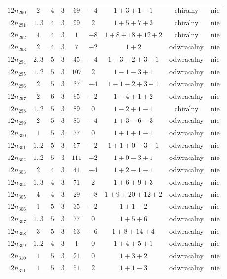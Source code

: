\begin{longtable}{ccccccccc}
$12n_{290}$ & $2$ & $4$ & $3$ & $69$ & $-4$ & $1+3+1-1$ & chiralny & nie \\
$12n_{291}$ & $1..3$ & $4$ & $3$ & $99$ & $2$ & $1+5+7+3$ & chiralny & nie \\
$12n_{292}$ & $4$ & $4$ & $3$ & $1$ & $-8$ & $1+8+18+12+2$ & chiralny & nie \\
$12n_{293}$ & $2$ & $4$ & $3$ & $7$ & $-2$ & $1+2$ & odwracalny & nie \\
$12n_{294}$ & $2..3$ & $5$ & $3$ & $45$ & $-4$ & $1-3-2+3+1$ & odwracalny & nie \\
$12n_{295}$ & $1..2$ & $5$ & $3$ & $107$ & $2$ & $1-1-3+1$ & odwracalny & nie \\
$12n_{296}$ & $2$ & $5$ & $3$ & $37$ & $-4$ & $1-1-2+3+1$ & odwracalny & nie \\
$12n_{297}$ & $2$ & $6$ & $3$ & $95$ & $-2$ & $1-4+1+2$ & odwracalny & nie \\
$12n_{298}$ & $1..2$ & $5$ & $3$ & $89$ & $0$ & $1-2+1-1$ & chiralny & nie \\
$12n_{299}$ & $2$ & $5$ & $3$ & $85$ & $-4$ & $1+3-6-3$ & odwracalny & nie \\
$12n_{300}$ & $1$ & $5$ & $3$ & $77$ & $0$ & $1+1+1-1$ & odwracalny & nie \\
$12n_{301}$ & $1..2$ & $5$ & $3$ & $67$ & $-2$ & $1+1+0-3-1$ & odwracalny & nie \\
$12n_{302}$ & $1..2$ & $5$ & $3$ & $111$ & $-2$ & $1+0-3+1$ & odwracalny & nie \\
$12n_{303}$ & $2$ & $4$ & $3$ & $41$ & $-4$ & $1+2-1-1$ & odwracalny & nie \\
$12n_{304}$ & $1..3$ & $4$ & $3$ & $71$ & $2$ & $1+6+9+3$ & odwracalny & nie \\
$12n_{305}$ & $4$ & $4$ & $3$ & $29$ & $-8$ & $1+9+20+12+2$ & odwracalny & nie \\
$12n_{306}$ & $1$ & $5$ & $3$ & $35$ & $-2$ & $1+1-2$ & odwracalny & nie \\
$12n_{307}$ & $1..3$ & $5$ & $3$ & $77$ & $0$ & $1+5+6$ & odwracalny & nie \\
$12n_{308}$ & $3$ & $5$ & $3$ & $63$ & $-6$ & $1+8+14+4$ & odwracalny & nie \\
$12n_{309}$ & $1..2$ & $4$ & $3$ & $1$ & $0$ & $1+4+5+1$ & odwracalny & nie \\
$12n_{310}$ & $1$ & $5$ & $3$ & $21$ & $0$ & $1+3+2$ & odwracalny & nie \\
$12n_{311}$ & $1$ & $5$ & $3$ & $51$ & $2$ & $1+1-3$ & odwracalny & nie \\

\end{longtable}
